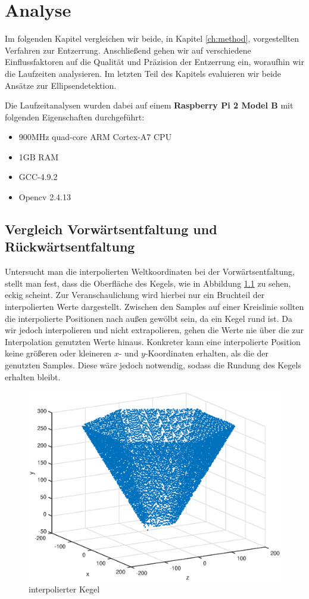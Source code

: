\chapter{Analyse}
\label{ch:analysis}

Im folgenden Kapitel vergleichen wir beide, in Kapitel \ref{ch:method}, vorgestellten Verfahren zur Entzerrung. Anschließend gehen wir auf verschiedene Einflussfaktoren auf die Qualität und Präzision der Entzerrung ein, woraufhin wir die Laufzeiten analysieren. Im letzten Teil des Kapitels evaluieren wir beide Ansätze zur Ellipsendetektion.


Die Laufzeitanalysen wurden dabei auf einem \textbf{Raspberry Pi 2 Model B} mit folgenden Eigenschaften durchgeführt:
\begin{itemize}
	\item 900MHz quad-core ARM Cortex-A7 CPU
	\item 1GB RAM
	\item GCC-4.9.2
	\item Opencv 2.4.13
\end{itemize}


\section{Vergleich Vorwärtsentfaltung und Rückwärtsentfaltung}
Untersucht man die interpolierten Weltkoordinaten bei der Vorwärtsentfaltung, stellt man fest, dass die Oberfläche des Kegels,  wie in Abbildung \ref{fig:3DInterpol} zu sehen, eckig scheint. Zur Veranschaulichung wird hierbei nur ein Bruchteil der interpolierten Werte dargestellt. Zwischen den Samples auf einer Kreislinie sollten die interpolierte Positionen nach außen gewölbt sein, da ein Kegel rund ist. Da wir jedoch interpolieren und nicht extrapolieren, gehen die Werte nie über die zur Interpolation genutzten Werte hinaus. Konkreter kann eine interpolierte Position keine größeren oder kleineren $x$- und $y$-Koordinaten erhalten, als die der genutzten Samples. Diese wäre jedoch notwendig, sodass die Rundung des Kegels erhalten bleibt.

\begin{figure}[!htb]
	\centering
	\includegraphics[scale=.7]{images/3d_interpol.eps}
	\caption{interpolierter Kegel}
	\label{fig:3DInterpol}
\end{figure}

